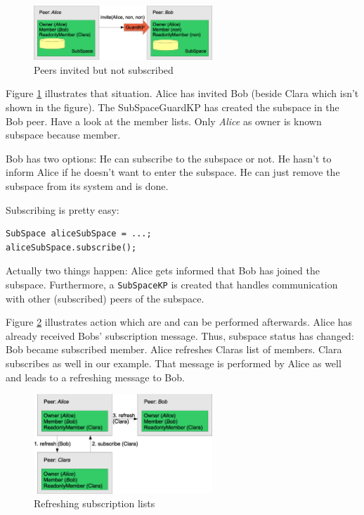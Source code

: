 \begin{figure}[t]
\centering
\includegraphics[width=0.60\textwidth]{subspaceAfterInvitation.eps}
\caption{Peers invited but not subscribed}
\label{fig:subspaceAfterInvitation}
\end{figure}

Figure \ref{fig:subspaceAfterInvitation} illustrates that situation.
Alice has invited Bob (beside Clara which isn't shown in the figure). The
SubSpaceGuardKP has created the subspace in the Bob peer. Have a look
at the member lists. Only {\it Alice} as owner is known subspace because member.

Bob has two options: He can subscribe to the subspace or not. He hasn't to inform Alice if he doesn't want to enter the subspace. He can just remove the subspace from its system and is done.

Subscribing is pretty easy:

\begin{verbatim}
SubSpace aliceSubSpace = ...;
aliceSubSpace.subscribe();
\end{verbatim}

Actually two things happen: Alice gets informed that Bob has joined the subspace. Furthermore, a {\verb|SubSpaceKP|} is created that handles communication with other (subscribed) peers of the subspace.

Figure \ref{fig:subSpaceRefreshing} illustrates action which are and can
be performed afterwards. Alice has already received Bobs' subscription message. 
Thus, subspace status has changed: Bob became subscribed member. Alice refreshes
Claras list of members. Clara subscribes as well in our example. That message
is performed by Alice as well and leads to a refreshing message to Bob.

\begin{figure}[t]
\centering
\includegraphics[width=0.60\textwidth]{subSpaceRefreshing.eps}
\caption{Refreshing subscription lists}
\label{fig:subSpaceRefreshing}
\end{figure}

